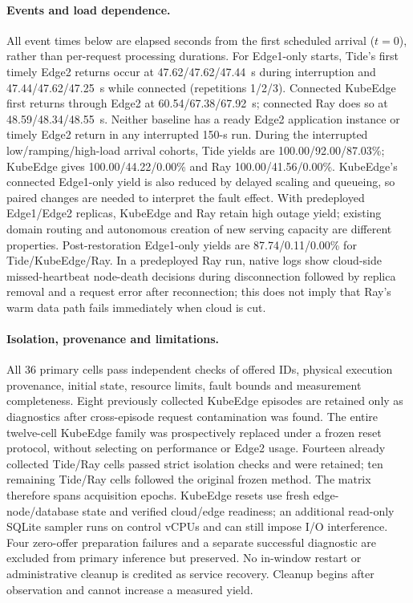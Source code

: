 \paragraph{Events and load dependence.}
All event times below are elapsed seconds from the first scheduled arrival ($t=0$), rather than per-request processing durations. For Edge1-only starts, Tide's first timely Edge2 returns occur at 47.62/47.62/47.44~s during interruption and 47.44/47.62/47.25~s while connected (repetitions 1/2/3). Connected KubeEdge first returns through Edge2 at 60.54/67.38/67.92~s; connected Ray does so at 48.59/48.34/48.55~s. Neither baseline has a ready Edge2 application instance or timely Edge2 return in any interrupted 150-s run. During the interrupted low/ramping/high-load arrival cohorts, Tide yields are 100.00/92.00/87.03\%; KubeEdge gives 100.00/44.22/0.00\% and Ray 100.00/41.56/0.00\%. KubeEdge's connected Edge1-only yield is also reduced by delayed scaling and queueing, so paired changes are needed to interpret the fault effect. With predeployed Edge1/Edge2 replicas, KubeEdge and Ray retain high outage yield; existing domain routing and autonomous creation of new serving capacity are different properties. Post-restoration Edge1-only yields are 87.74/0.11/0.00\% for Tide/KubeEdge/Ray. In a predeployed Ray run, native logs show cloud-side missed-heartbeat node-death decisions during disconnection followed by replica removal and a request error after reconnection; this does not imply that Ray's warm data path fails immediately when cloud is cut.

\paragraph{Isolation, provenance and limitations.}
All 36 primary cells pass independent checks of offered IDs, physical execution provenance, initial state, resource limits, fault bounds and measurement completeness. Eight previously collected KubeEdge episodes are retained only as diagnostics after cross-episode request contamination was found. The entire twelve-cell KubeEdge family was prospectively replaced under a frozen reset protocol, without selecting on performance or Edge2 usage. Fourteen already collected Tide/Ray cells passed strict isolation checks and were retained; ten remaining Tide/Ray cells followed the original frozen method. The matrix therefore spans acquisition epochs. KubeEdge resets use fresh edge-node/database state and verified cloud/edge readiness; an additional read-only SQLite sampler runs on control vCPUs and can still impose I/O interference. Four zero-offer preparation failures and a separate successful diagnostic are excluded from primary inference but preserved. No in-window restart or administrative cleanup is credited as service recovery. Cleanup begins after observation and cannot increase a measured yield.

